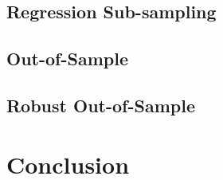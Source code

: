 \documentclass[11pt]{article}
\begin{document}

%
%
%
%
%
%
%

%



%
\subsection{Regression Sub-sampling}\label{sec:subsampling}
%


\subsection{Out-of-Sample} \label{sec:out_sample}



\subsection{Robust Out-of-Sample}




\section{Conclusion}


\end{document}
